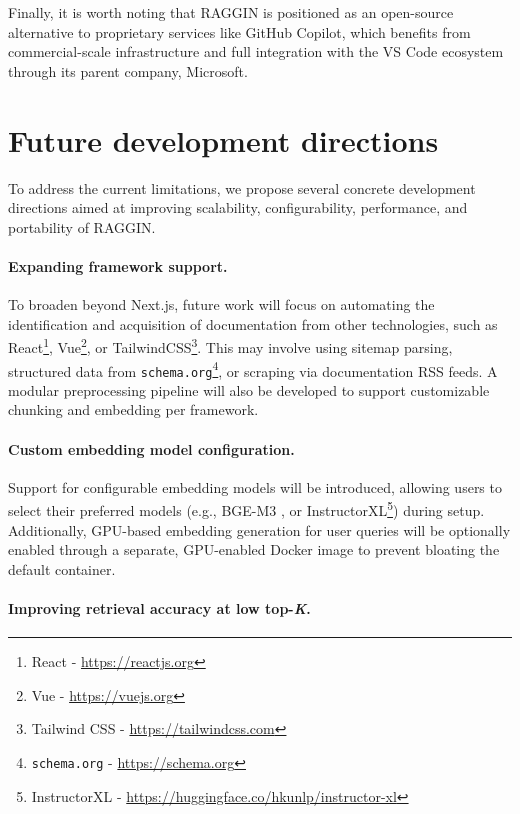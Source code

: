 Finally, it is worth noting that RAGGIN is positioned as an open-source alternative to proprietary services like GitHub Copilot, which benefits from commercial-scale infrastructure and full integration with the VS Code ecosystem through its parent company, Microsoft.

\section{Future development directions}

To address the current limitations, we propose several concrete development directions aimed at improving scalability, configurability, performance, and portability of RAGGIN.

\paragraph*{Expanding framework support.}

To broaden beyond Next.js, future work will focus on automating the identification and acquisition of documentation from other technologies, such as React\footnote{React - \url{https://reactjs.org}}, Vue\footnote{Vue - \url{https://vuejs.org}}, or TailwindCSS\footnote{Tailwind CSS - \url{https://tailwindcss.com}}. This may involve using sitemap parsing, structured data from \texttt{schema.org}\footnote{\texttt{schema.org} - \url{https://schema.org}}, or scraping via documentation RSS feeds. A modular preprocessing pipeline will also be developed to support customizable chunking and embedding per framework.

\paragraph*{Custom embedding model configuration.}

Support for configurable embedding models will be introduced, allowing users to select their preferred models (e.g., BGE-M3 \cite{chen2024bge}, or InstructorXL\footnote{InstructorXL - \url{https://huggingface.co/hkunlp/instructor-xl}}) during setup. Additionally, GPU-based embedding generation for user queries will be optionally enabled through a separate, GPU-enabled Docker image to prevent bloating the default container.

\paragraph*{Improving retrieval accuracy at low top-\textit{K}.}

